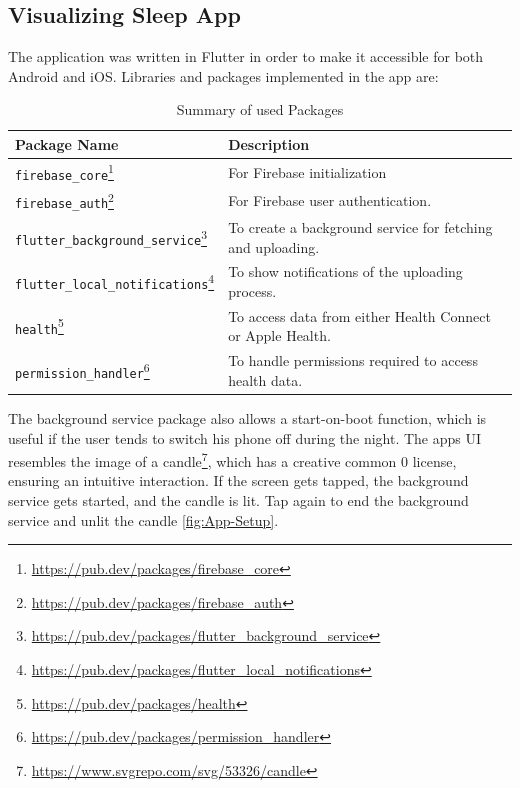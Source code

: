 \documentclass[
  a4paper,  %
  twoside,  %
  bibliography=totoc,
  headsepline,
  cleardoublepage=empty,
  parskip=half,
  draft=false
]{scrbook}
\begin{document}
\subsection{Visualizing Sleep App}
The application was written in Flutter in order to make it accessible for both Android and iOS. Libraries and packages implemented in the app are:
\begin{table}[h]
\centering

\begin{tabular}{|l|l|}
\hline
\textbf{Package Name}                  & \textbf{Description} \\ \hline
\texttt{firebase\_core}\footnote{\url{https://pub.dev/packages/firebase_core}}                & For Firebase initialization \\ \hline
\texttt{firebase\_auth}\footnote{\url{https://pub.dev/packages/firebase_auth}}                & For Firebase user authentication. \\ \hline
\texttt{flutter\_background\_service}\footnote{\url{https://pub.dev/packages/flutter_background_service}}  & To create a background service for fetching and uploading. \\ \hline
\texttt{flutter\_local\_notifications}\footnote{\url{https://pub.dev/packages/flutter_local_notifications}} & To show notifications of the uploading process. \\ \hline
\texttt{health}\footnote{\url{https://pub.dev/packages/health}}                        & To access data from either Health Connect or Apple Health. \\ \hline
\texttt{permission\_handler}\footnote{\url{https://pub.dev/packages/permission_handler}}           & To handle permissions required to access health data. \\ \hline
\end{tabular}
\caption{Summary of used Packages}
\label{tab:packages}
\end{table}


The background service package also allows a start-on-boot function, which is useful if the user tends to switch his phone off during the night. The apps UI resembles the image of a candle\footnote{\url{https://www.svgrepo.com/svg/53326/candle}}, which has a creative common 0 license, ensuring an intuitive interaction. If the screen gets tapped, the background service gets started, and the candle is lit. Tap again to end the background service and unlit the candle \autoref{fig:App-Setup}. 
\end{document}
